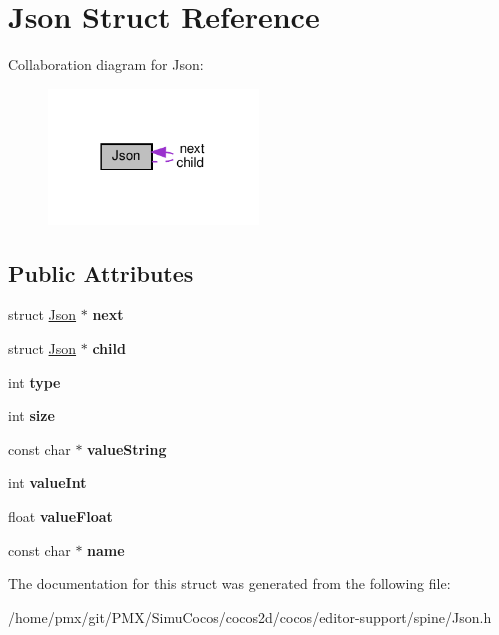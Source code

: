 \hypertarget{structJson}{}\section{Json Struct Reference}
\label{structJson}


Collaboration diagram for Json\+:
\nopagebreak
\begin{figure}[H]
\begin{center}
\leavevmode
\includegraphics[width=158pt]{structJson__coll__graph}
\end{center}
\end{figure}
\subsection*{Public Attributes}
\begin{DoxyCompactItemize}
\item 
\mbox{\label{structJson_ae559ba5abbeeae8058571630ec1d6d3e}} 
struct \hyperlink{structJson}{Json} $\ast$ {\bfseries next}
\item 
\mbox{\label{structJson_a2404d72da0d0723107d67d88157a62bd}} 
struct \hyperlink{structJson}{Json} $\ast$ {\bfseries child}
\item 
\mbox{\label{structJson_a5f2cc75752d434236072eb6df8f08644}} 
int {\bfseries type}
\item 
\mbox{\label{structJson_a84cbc56cf66a6c996cef67d431450164}} 
int {\bfseries size}
\item 
\mbox{\label{structJson_a614cf1a3240c3e666ebde93a5aca5bea}} 
const char $\ast$ {\bfseries value\+String}
\item 
\mbox{\label{structJson_acd5cb9b4d037d9f18ef02fa418376a1a}} 
int {\bfseries value\+Int}
\item 
\mbox{\label{structJson_a7f0a905afb597509961dd66ee1c7ab67}} 
float {\bfseries value\+Float}
\item 
\mbox{\label{structJson_a468313322f74472ae745194b62a3e92c}} 
const char $\ast$ {\bfseries name}
\end{DoxyCompactItemize}


The documentation for this struct was generated from the following file\+:\begin{DoxyCompactItemize}
\item 
/home/pmx/git/\+P\+M\+X/\+Simu\+Cocos/cocos2d/cocos/editor-\/support/spine/Json.\+h\end{DoxyCompactItemize}
